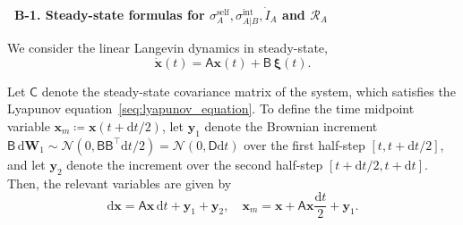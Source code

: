 \documentclass[
 longbibliography,
 twocolumn,
 superscriptaddress,
 amsmath,
 amssymb,
 amsthm,
 amsfonts,
 prl,
 floatfix,
]{revtex4-2}
\newcommand{\matbf}[1]{\boldsymbol{\mathsf{#1}}}
\begin{document}
\begin{widetext}
\bigskip
\noindent\textbf{\textbullet\ B-1. Steady-state formulas for $\sigma_A^{\mathrm{self}},\sigma_{A|B}^{\mathrm{int}},\dot I_A$ and $\mathcal R_A$}

We consider the linear Langevin dynamics in steady-state,
\begin{equation*}
    \dot{\bm{x}}(t)=\matbf{A}\bm{x}(t)+\matbf{B}\,\bm{\xi}(t).
\end{equation*}

Let $\matbf C$ denote the steady-state covariance matrix of the system, which satisfies the Lyapunov equation~\eqref{seq:lyapunov_equation}.
To define the time midpoint variable $\bm x_m\coloneq \bm x(t+\mathrm{d}t/2)$, let $\bm y_1$ denote the Brownian increment $\matbf{B}\,\mathrm{d}\bm W_1\sim\mathcal{N}(0,\matbf{B}\matbf{B}^\intercal\mathrm dt/2)=\mathcal{N}(0,\matbf{D}\mathrm{d}t)$ over the first half-step $[t,t+\mathrm{d}t/2]$, and let $\bm y_2$ denote the increment over the second half-step $[t+\mathrm dt/2,t+\mathrm dt]$. Then, the relevant variables are given by
\[
    \mathrm{d}\bm x=\matbf{A}\bm x\,\mathrm{d}t+\bm y_1+\bm y_2,
    \quad
    \bm x_m=\bm x+\matbf{A}\bm x\frac{\mathrm{d}t}{2}+\bm y_1.
\]


\end{widetext}
\end{document}
